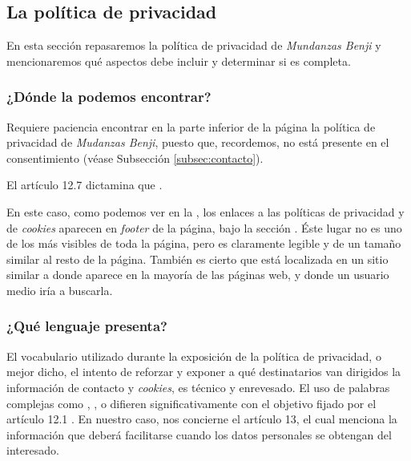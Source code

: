 \subsection{La política de privacidad}\label{subsec:privacidad}
En esta sección repasaremos la política de privacidad de \textit{Mundanzas Benji} y mencionaremos qué aspectos debe incluir y determinar si es completa.

\subsubsection{¿Dónde la podemos encontrar?}
Requiere paciencia encontrar en la parte inferior de la página la política de privacidad de \textit{Mudanzas Benji}, puesto que, recordemos, no está presente en el consentimiento (véase Subsección \ref{subsec:contacto}).

El artículo 12.7 dictamina que . 

En este caso, como podemos ver en la , los enlaces a las políticas de privacidad y de \textit{cookies} aparecen en \textit{footer} de la página, bajo la sección . Éste lugar no es uno de los más visibles de toda la página, pero es claramente legible y de un tamaño similar al resto de la página.
También es cierto que está localizada en un sitio similar a donde aparece en la mayoría de las páginas web, y donde un usuario medio iría a buscarla.



\subsubsection{¿Qué lenguaje presenta?}
El vocabulario utilizado durante la exposición de la política de privacidad, o mejor dicho, el intento de reforzar y exponer a qué destinatarios van dirigidos la información de contacto y \textit{cookies}, es técnico y enrevesado. El uso de palabras complejas como , ,  o  difieren significativamente con el objetivo fijado por el artículo 12.1 . En nuestro caso, nos concierne el artículo 13, el cual menciona la información que deberá facilitarse cuando los datos personales se obtengan del interesado.


